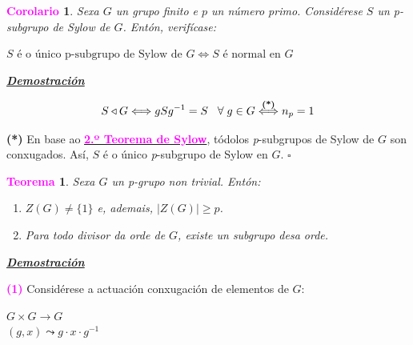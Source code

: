 \documentclass[twoside]{report}
\newcommand{\magbf}[1]{\textcolor{magenta}{\textbf{#1}}} %
\theoremstyle{mystyle}
\newtheorem{theo}{\magbf{Teorema}}[chapter]
\newtheorem{cor}{\magbf{Corolario}}[chapter]
\newenvironment{theorem}
{\begin{mdframed}[linecolor = magenta,backgroundcolor = classicrose, linewidth = 2mm]\begin{theo}}
{\end{theo}\end{mdframed}}
\newenvironment{corollary}
{\begin{mdframed}[linecolor = magenta,backgroundcolor = classicrose, linewidth = 2mm]\begin{cor}}
{\end{cor}\end{mdframed}}
\begin{document}
\vspace{3mm}

\begin{corollary}\label{cor1.5}
Sexa $G$ un grupo finito e $p$ un número primo. Considérese $S$ un p-subgrupo de Sylow de $G$. Entón, verifícase:
\begin{center}
$S \text{ é o único p-subgrupo de Sylow de } G \Longleftrightarrow S \text{ é normal en } G$
\end{center}
\end{corollary}

\vspace{2mm}

\noindent \textbf{\textit{\underline{Demostración}}}

$$S \triangleleft G \Longleftrightarrow gSg^{-1} = S \hspace{3mm} \forall \hspace{1mm} g \in G \overset{\textbf{(*)}}{\Longleftrightarrow} n_{p} = 1$$

\noindent \textbf{(*)} En base ao \hyperref[th1.12]{\magbf{2.º Teorema de Sylow}}, tódolos \textit{p}-subgrupos de Sylow de $G$ son conxugados. Así, $S$ é o único \textit{p}-subgrupo de Sylow en $G$. $\square$\\

\vspace{3mm}

\begin{theorem} \label{th1.13} 
Sexa $G$ un p-grupo non trivial. Entón: 
\begin{enumerate}
    \item \textit{$Z(G) \neq \{1\}$ e, ademais, $|Z(G)| \geq p$.}
    \item \textit{Para todo divisor da orde de $G$, existe un subgrupo desa orde}.
\end{enumerate}
\end{theorem}

\vspace{2mm}

\noindent \textbf{\textit{\underline{Demostración}}}

\vspace{2mm}

\noindent \magbf{(1)} Considérese a actuación conxugación de elementos de $G$:

    \begin{center}
    $G \times G \longrightarrow G$ \\
    \vspace{2mm}
    \hspace{8mm} $(g,x) \leadsto g \cdot x \cdot g^{-1}$
    \end{center}  
    
\end{document}
